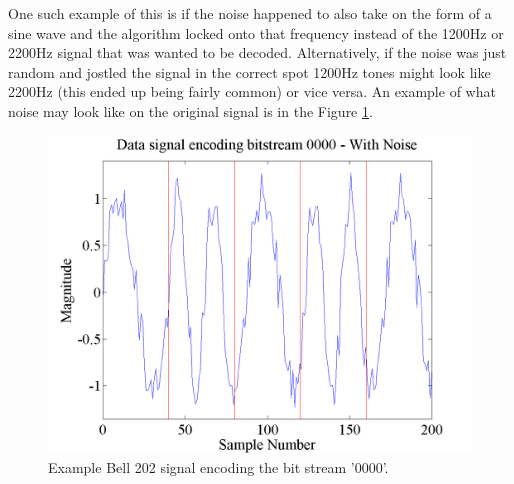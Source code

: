 One such example of this is if the noise happened to also take on the form of a sine wave and the algorithm locked onto that frequency instead of the 1200Hz or 2200Hz signal that was wanted to be decoded. Alternatively, if the noise was just random and jostled the signal in the correct spot 1200Hz tones might look like 2200Hz (this ended up being fairly common) or vice versa. An example of what noise may look like on the original signal is in the Figure \ref{noiseExample}.
\begin{figure}
  \centering
	\includegraphics[width=0.75\linewidth]{images/Datasignalencodingbitstream0000WithNoise.png} 
	\caption{Example Bell 202 signal encoding the bit stream '0000'.}
   \label{noiseExample}
\end{figure}

